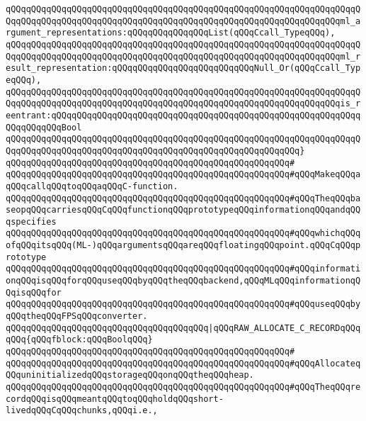 \verb|qQQqqQQqqQQqqQQqqQQqqQQqqQQqqQQqqQQqqQQqqQQqqQQqqQQqqQQqqQQqqQQqqQQqqQQqqQQqqQQqqQQqqQQqqQQqqQQqqQQqqQQqqQQqqQQqqQQqqQQqqQQqqQQqqQQqqQQqml_argument_representations:qQQqqQQqqQQqqQQqList(qQQqCcall_TypeqQQq),|\newline
\verb|qQQqqQQqqQQqqQQqqQQqqQQqqQQqqQQqqQQqqQQqqQQqqQQqqQQqqQQqqQQqqQQqqQQqqQQqqQQqqQQqqQQqqQQqqQQqqQQqqQQqqQQqqQQqqQQqqQQqqQQqqQQqqQQqqQQqqQQqml_result_representation:qQQqqQQqqQQqqQQqqQQqqQQqqQQqNull_Or(qQQqCcall_TypeqQQq),|\newline
\verb|qQQqqQQqqQQqqQQqqQQqqQQqqQQqqQQqqQQqqQQqqQQqqQQqqQQqqQQqqQQqqQQqqQQqqQQqqQQqqQQqqQQqqQQqqQQqqQQqqQQqqQQqqQQqqQQqqQQqqQQqqQQqqQQqqQQqqQQqis_reentrant:qQQqqQQqqQQqqQQqqQQqqQQqqQQqqQQqqQQqqQQqqQQqqQQqqQQqqQQqqQQqqQQqqQQqqQQqBool|\newline
\verb|qQQqqQQqqQQqqQQqqQQqqQQqqQQqqQQqqQQqqQQqqQQqqQQqqQQqqQQqqQQqqQQqqQQqqQQqqQQqqQQqqQQqqQQqqQQqqQQqqQQqqQQqqQQqqQQqqQQqqQQqqQQqqQQq}|\newline
\verb|qQQqqQQqqQQqqQQqqQQqqQQqqQQqqQQqqQQqqQQqqQQqqQQqqQQqqQQq#|\newline
\verb|qQQqqQQqqQQqqQQqqQQqqQQqqQQqqQQqqQQqqQQqqQQqqQQqqQQqqQQq#qQQqMakeqQQqaqQQqcallqQQqtoqQQqaqQQqC-function.|\newline
\verb|qQQqqQQqqQQqqQQqqQQqqQQqqQQqqQQqqQQqqQQqqQQqqQQqqQQqqQQq#qQQqTheqQQqbaseopqQQqcarriesqQQqCqQQqfunctionqQQqprototypeqQQqinformationqQQqandqQQqspecifies|\newline
\verb|qQQqqQQqqQQqqQQqqQQqqQQqqQQqqQQqqQQqqQQqqQQqqQQqqQQqqQQq#qQQqwhichqQQqofqQQqitsqQQq(ML-)qQQqargumentsqQQqareqQQqfloatingqQQqpoint.qQQqCqQQqprototype|\newline
\verb|qQQqqQQqqQQqqQQqqQQqqQQqqQQqqQQqqQQqqQQqqQQqqQQqqQQqqQQq#qQQqinformationqQQqisqQQqforqQQquseqQQqbyqQQqtheqQQqbackend,qQQqMLqQQqinformationqQQqisqQQqfor|\newline
\verb|qQQqqQQqqQQqqQQqqQQqqQQqqQQqqQQqqQQqqQQqqQQqqQQqqQQqqQQq#qQQquseqQQqbyqQQqtheqQQqFPSqQQqconverter.|\newline
\newline
\verb|qQQqqQQqqQQqqQQqqQQqqQQqqQQqqQQqqQQqqQQq|\verb#|qQQqRAW_ALLOCATE_C_RECORDqQQqqQQq{qQQqfblock:qQQqBoolqQQq}#\newline
\verb|qQQqqQQqqQQqqQQqqQQqqQQqqQQqqQQqqQQqqQQqqQQqqQQqqQQqqQQq#|\newline
\verb|qQQqqQQqqQQqqQQqqQQqqQQqqQQqqQQqqQQqqQQqqQQqqQQqqQQqqQQq#qQQqAllocateqQQquninitializedqQQqstorageqQQqonqQQqtheqQQqheap.|\newline
\verb|qQQqqQQqqQQqqQQqqQQqqQQqqQQqqQQqqQQqqQQqqQQqqQQqqQQqqQQq#qQQqTheqQQqrecordqQQqisqQQqmeantqQQqtoqQQqholdqQQqshort-livedqQQqCqQQqchunks,qQQqi.e.,|\newline
